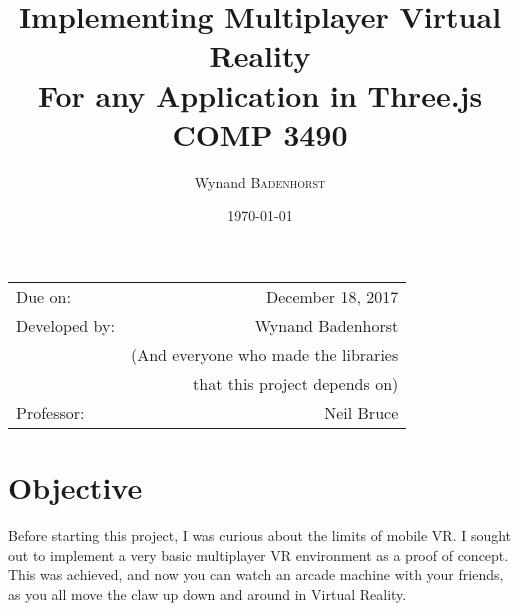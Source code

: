\documentclass{article}
\title{Implementing Multiplayer Virtual Reality \\ For any Application in Three.js\\ COMP 3490} %
\author{Wynand \textsc{Badenhorst}} %
\date{\today} %
\begin{document}
\maketitle %

\begin{center}
\begin{tabular}{l r}
Due on: & December 18, 2017 \\ %
Developed by: & Wynand Badenhorst \\ %
& (And everyone who made the libraries \\ 
&that this project depends on) \\
Professor: & Neil Bruce %
\end{tabular}

\end{center}



\section{Objective}

Before starting this project, I was curious about the limits of mobile VR.  I sought out to implement a very basic multiplayer VR environment as a proof of concept.  This was achieved, and now you can watch an arcade machine with your friends, as you all move the claw up down and around in Virtual Reality.

 
 \clearpage
 
\end{document}
